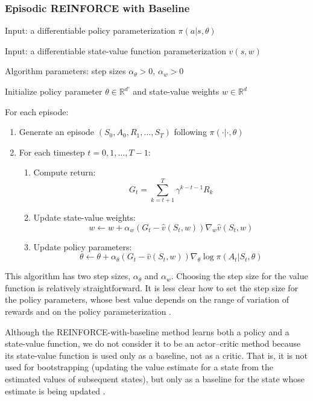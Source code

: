 \subsubsection{Episodic REINFORCE with Baseline}


Input: a differentiable policy parameterization $\pi(a|s,\theta)$


Input: a differentiable state-value function parameterization $\hat v(s,w)$


Algorithm parameters: step sizes $\alpha_\theta > 0$, $\alpha_w > 0$


Initialize policy parameter $\theta \in \mathbb{R}^{d'}$ and state-value weights $w \in \mathbb{R}^d$


For each episode:

\begin{enumerate}
\item Generate an episode $(S_0,A_0,R_1,\ldots,S_T)$ following $\pi(\cdot|\cdot,\theta)$
\item For each timestep $t = 0,1,\ldots,T-1$:
    \begin{enumerate}
    \item Compute return:
    \[
    G_t= \sum_{k=t+1}^{T} \gamma^{k-t-1} R_k
    \]
    \item Update state-value weights:
    \[
    w \leftarrow w + \alpha_w (G_t - \hat v(S_t,w)) \nabla_w \hat v(S_t,w)
    \]
    \item Update policy parameters:
    \[
    \theta \leftarrow \theta + \alpha_\theta (G_t - \hat v(S_t,w)) \nabla_\theta \log \pi(A_t|S_t,\theta)
    \]
    \end{enumerate}
\end{enumerate}

This algorithm has two step sizes, $\alpha_\theta$ and $\alpha_w$. Choosing the step size for the value function is relatively straightforward. It is less clear how to set the step size for the policy parameters, whose best value depends on the range of variation of rewards and on the policy parameterization \cite{sutton}.

Although the REINFORCE-with-baseline method learns both a policy and a state-value function, we do not consider it to be an actor–critic method because its state-value function is used only as a baseline, not as a critic. That is, it is not used for bootstrapping (updating the value estimate for a state from the estimated values of subsequent states), but only as a baseline for the state whose estimate is being updated \cite{sutton}.

